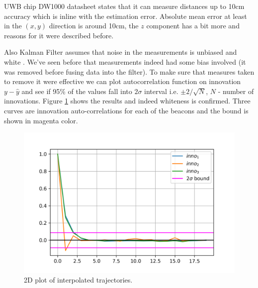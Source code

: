 UWB chip DW1000 datasheet \cite{dw1000chip} states that it can measure distances up to 10cm accuracy which is inline with the estimation error. Absolute mean error at least in the $(x,y)$ direction is around 10cm, the $z$ component has a bit more and reasons for it were described before.

Also Kalman Filter assumes that noise in the measurements is unbiased and white \cite{Reid2010EstimationI}. We've seen before that measurements indeed had some bias involved (it was removed before fusing data into the filter). To make sure that measures taken to remove it were effective we can plot autocorrelation function on innovation $y - \hat{y}$ and see if 95\% of the values fall into $2 \sigma$ interval i.e. $\pm 2 / \sqrt{N}$, $N$ - number of innovations. Figure \ref{fig:inno_whiteness} shows the results and indeed whiteness is confirmed. Three curves are innovation auto-correlations for each of the beacons and the bound is shown in magenta color.

\begin{figure}[H]
    \centering
    \includegraphics[width=\linewidth]{figures/inno_whiteness.png}
    \caption{2D plot of interpolated trajectories.}
    \label{fig:inno_whiteness}
\end{figure}

